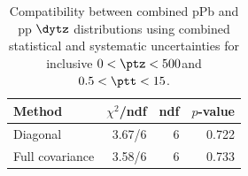 \begin{table}[htp!]
\centering
\begin{tabular}{|l|r|r|r|}
\hline
Method & $\chi^2$/ndf & ndf & $p$-value \\
\hline
Diagonal & 3.67/6 & 6 & 0.722 \\
Full covariance & 3.58/6 & 6 & 0.733 \\
\hline
\end{tabular}
\caption{Compatibility between combined pPb and pp $\dytz$ distributions using combined statistical and systematic uncertainties for inclusive $0 < \ptz < 500$\GeV and $0.5 < \ptt < 15$\GeV.}
\label{table:chisq_deta}
\end{table}
